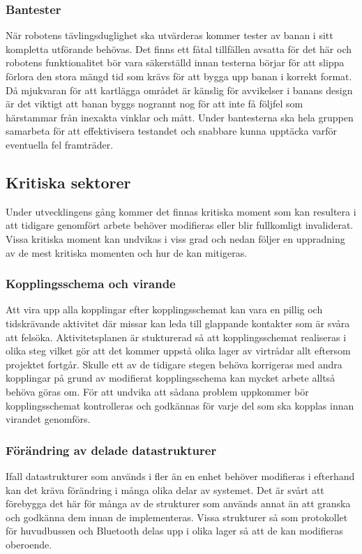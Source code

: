 \documentclass{article}
\begin{document}
\subsubsection{Bantester}
\label{sec:bantester}
När robotens tävlingsduglighet ska utvärderas kommer tester av banan i sitt kompletta utförande behövas. Det finns ett fåtal tillfällen avsatta för det här och robotens funktionalitet bör vara säkerställd innan testerna börjar för att slippa förlora den stora mängd tid som krävs för att bygga upp banan i korrekt format. Då mjukvaran för att kartlägga området är känslig för avvikelser i banans design är det viktigt att banan byggs nogrannt nog för att inte få följfel som härstammar från inexakta vinklar och mått. Under bantesterna ska hela gruppen samarbeta för att effektivisera testandet och snabbare kunna upptäcka varför eventuella fel framträder.

\subsection{Kritiska sektorer}
Under utvecklingens gång kommer det finnas kritiska moment som kan resultera i att tidigare genomfört arbete behöver modifieras eller blir fullkomligt invaliderat. Vissa kritiska moment kan undvikas i viss grad och nedan följer en uppradning av de mest kritiska momenten och hur de kan mitigeras.

\subsubsection{Kopplingsschema och virande}
Att vira upp alla kopplingar efter kopplingsschemat kan vara en pillig och tidskrävande aktivitet där missar kan leda till glappande kontakter som är svåra att felsöka. Aktivitetsplanen är stukturerad så att kopplingsschemat realiseras i olika steg vilket gör att det kommer uppstå olika lager av virtrådar allt eftersom projektet fortgår. Skulle ett av de tidigare stegen behöva korrigeras med andra kopplingar på grund av modifierat kopplingsschema kan mycket arbete alltså behöva göras om. För att undvika att sådana problem uppkommer bör kopplingsschemat kontrolleras och godkännas för varje del som ska kopplas innan virandet genomförs.

\subsubsection{Förändring av delade datastrukturer}
Ifall datastrukturer som används i fler än en enhet behöver modifieras i efterhand kan det kräva förändring i många olika delar av systemet. Det är svårt att förebygga det här för många av de strukturer som används annat än att granska och godkänna dem innan de implementeras. Vissa strukturer så som protokollet för huvudbussen och Bluetooth delas upp i olika lager så att de kan modifieras oberoende.
\end{document}
